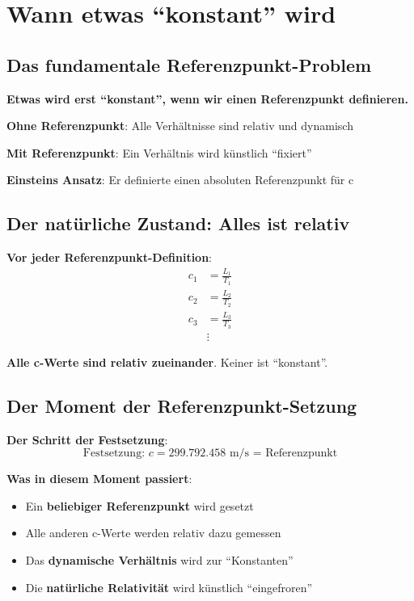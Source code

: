 	\section{Wann etwas ``konstant'' wird}
	
	\subsection{Das fundamentale Referenzpunkt-Problem}
	
	\begin{tcolorbox}[colback=red!5!white,colframe=red!75!black,title=Referenzpunkt und Konstanz]
		\textbf{Etwas wird erst ``konstant'', wenn wir einen Referenzpunkt definieren.}
		
		\textbf{Ohne Referenzpunkt}: Alle Verhältnisse sind relativ und dynamisch
		
		\textbf{Mit Referenzpunkt}: Ein Verhältnis wird künstlich ``fixiert''
		
		\textbf{Einsteins Ansatz}: Er definierte einen absoluten Referenzpunkt für c
	\end{tcolorbox}
	
	\subsection{Der natürliche Zustand: Alles ist relativ}
	
	\textbf{Vor jeder Referenzpunkt-Definition}:
	\begin{align}
		c_1 &= \frac{L_1}{T_1} \\
		c_2 &= \frac{L_2}{T_2} \\
		c_3 &= \frac{L_3}{T_3} \\
		&\vdots
	\end{align}
	
	\textbf{Alle c-Werte sind relativ zueinander}. Keiner ist ``konstant''.
	
	\subsection{Der Moment der Referenzpunkt-Setzung}
	
	\textbf{Der Schritt der Festsetzung}:
	\begin{equation}
		\text{Festsetzung: } c = 299.792.458 \text{ m/s = Referenzpunkt}
	\end{equation}
	
	\textbf{Was in diesem Moment passiert}:
	\begin{itemize}
		\item Ein \textbf{beliebiger Referenzpunkt} wird gesetzt
		\item Alle anderen c-Werte werden relativ dazu gemessen
		\item Das \textbf{dynamische Verhältnis} wird zur ``Konstanten''
		\item Die \textbf{natürliche Relativität} wird künstlich ``eingefroren''
	\end{itemize}
	
